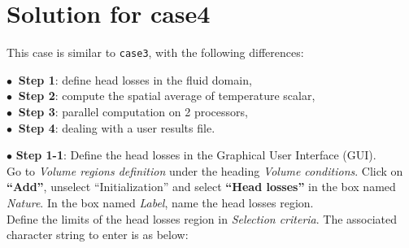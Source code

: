 
%
%
%
%


\section{Solution for case4}
This case is similar to \texttt{case3}, with the following differences:

\hspace*{1cm}$\bullet\ $ \textbf{Step 1}: define head losses in the fluid domain,\\
\hspace*{1cm}$\bullet\ $ \textbf{Step 2}: compute the spatial average of temperature scalar,\\
\hspace*{1cm}$\bullet\ $ \textbf{Step 3}: parallel computation on 2 processors,\\
\hspace*{1cm}$\bullet\ $ \textbf{Step 4}: dealing with a user results file.

$\bullet$ \textbf{Step 1-1}: Define the head losses in the Graphical User Interface (GUI). \\
Go to {\itshape Volume regions definition} under the heading {\itshape Volume conditions}.
Click on {\bf``Add''}, unselect ``Initialization'' and select {\bf``Head losses''} in the box named {\itshape Nature}.
In the box named {\itshape Label}, name the head losses region. \\
Define the limits of the head losses region in {\itshape Selection criteria}.
The associated character string to enter is as below:\\

